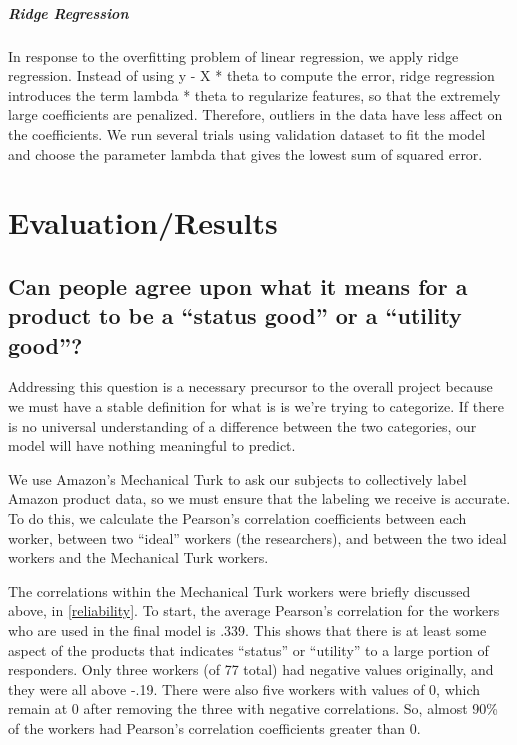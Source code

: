 \documentclass[dvips,12pt]{article}
\begin{document}
\subparagraph{Ridge Regression}
In response to the overfitting problem of linear regression, we apply ridge regression. Instead of using y - X * theta to compute the error, ridge regression introduces the term lambda * theta to regularize features, so that the extremely large coefficients are penalized. Therefore, outliers in the data have less affect on the coefficients. We run several trials using validation dataset to fit the model and choose the parameter lambda that gives the lowest sum of squared error. 

\section{Evaluation/Results}

\subsection{Can people agree upon what it means for a product to be a “status good” or a “utility good”?}
Addressing this question is a necessary precursor to the overall project because we must have a stable definition for what is is we’re trying to categorize. If there is no universal understanding of a difference between the two categories, our model will have nothing meaningful to predict. 

We use Amazon’s Mechanical Turk to ask our subjects to collectively label Amazon product data, so we must ensure that the labeling we receive is accurate. To do this, we calculate the Pearson’s correlation coefficients between each worker, between two “ideal” workers (the researchers), and between the two ideal workers and the Mechanical Turk workers. 

The correlations within the Mechanical Turk workers were briefly discussed above, in \ref{reliability}. To start, the average Pearson’s correlation for the workers who are used in the final model is .339. This shows that there is at least some aspect of the products that indicates “status” or “utility” to a large portion of responders. Only three workers (of 77 total) had negative values originally, and they were all above -.19. There were also five workers with values of 0, which remain at 0 after removing the three with negative correlations. So, almost 90\% of the workers had Pearson’s correlation coefficients greater than 0. 
\end{document}

